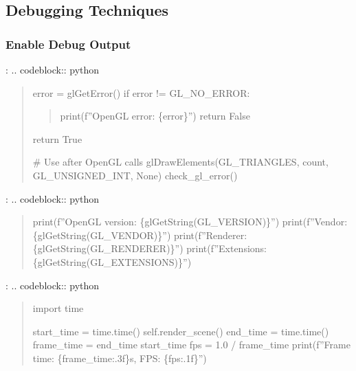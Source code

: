 \documentclass[a4paper,10pt,english,openany,oneside]{sphinxmanual}
\begin{document}
\subsection{Debugging Techniques}
\label{\detokenize{troubleshooting:debugging-techniques}}

\subsubsection{Enable Debug Output}
\label{\detokenize{troubleshooting:enable-debug-output}}
\sphinxAtStartPar
{}:
.. code\sphinxhyphen{}block:: python
\begin{quote}
\begin{description}
\sphinxAtStartPar
error = glGetError()
if error != GL\_NO\_ERROR:
\begin{quote}

\sphinxAtStartPar
print(f”OpenGL error: \{error\}”)
return False
\end{quote}

\sphinxAtStartPar
return True

\end{description}

\sphinxAtStartPar
\# Use after OpenGL calls
glDrawElements(GL\_TRIANGLES, count, GL\_UNSIGNED\_INT, None)
check\_gl\_error()
\end{quote}

\sphinxAtStartPar
{}:
.. code\sphinxhyphen{}block:: python
\begin{quote}
\begin{description}
\sphinxAtStartPar
print(f”OpenGL version: \{glGetString(GL\_VERSION)\}”)
print(f”Vendor: \{glGetString(GL\_VENDOR)\}”)
print(f”Renderer: \{glGetString(GL\_RENDERER)\}”)
print(f”Extensions: \{glGetString(GL\_EXTENSIONS)\}”)

\end{description}
\end{quote}

\sphinxAtStartPar
{}:
.. code\sphinxhyphen{}block:: python
\begin{quote}

\sphinxAtStartPar
import time
\begin{description}
\sphinxAtStartPar
start\_time = time.time()
self.render\_scene()
end\_time = time.time()
frame\_time = end\_time \sphinxhyphen{} start\_time
fps = 1.0 / frame\_time
print(f”Frame time: \{frame\_time:.3f\}s, FPS: \{fps:.1f\}”)

\end{description}
\end{quote}
\end{document}
